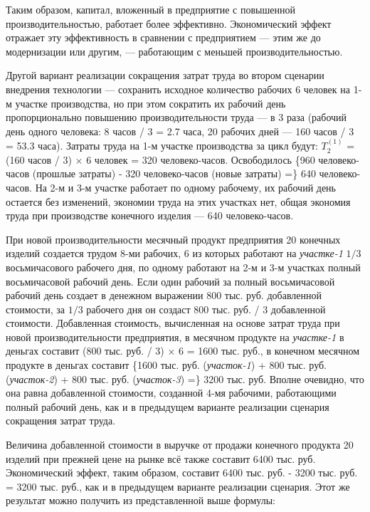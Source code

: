 \documentclass{article}
\let\textitorig\textit
\renewcommand{\textit}[1]{{\fontfamily{cmr}\selectfont \textitorig{#1}}}
\begin{document}
Таким образом, капитал, вложенный в предприятие с повышенной производительностью, работает более эффективно. Экономический эффект отражает эту эффективность в сравнении с предприятием — этим же до модернизации или другим, — работающим с меньшей производительностью.

Другой вариант реализации сокращения затрат труда во втором сценарии внедрения технологии — сохранить исходное количество рабочих 6 человек на 1-м участке производства, но при этом сократить их рабочий день пропорционально повышению производительности труда — в 3 раза (рабочий день одного человека: 8 часов / 3 = 2.7 часа, 20 рабочих дней — 160 часов / 3 = 53.3 часа). Затраты труда на 1-м участке производства за цикл будут: $T_2^{(1)}$ = (160 часов / 3) × 6 человек = 320 человеко-часов. Освободилось \{960 человеко-часов (прошлые затраты) - 320 человеко-часов (новые затраты) =\} 640 человеко-часов. На 2-м и 3-м участке работает по одному рабочему, их рабочий день остается без изменений, экономии труда на этих участках нет, общая экономия труда при производстве конечного изделия — 640 человеко-часов.

При новой производительности месячный продукт предприятия 20 конечных изделий создается трудом 8-ми рабочих, 6 из которых работают на \textit{участке-1} $1/3$ восьмичасового рабочего дня, по одному работают на 2-м и 3-м участках полный восьмичасовой рабочий день. Если один рабочий за полный восьмичасовой рабочий день создает в денежном выражении 800 тыс. руб. добавленной стоимости, за $1/3$ рабочего дня он создаст 800 тыс. руб. / 3 добавленной стоимости. Добавленная стоимость, вычисленная на основе затрат труда при новой производительности предприятия, в месячном продукте на \textit{участке-1} в деньгах составит (800 тыс. руб. / 3) × 6 = 1600 тыс. руб., в конечном месячном продукте в деньгах составит \{1600 тыс. руб. (\textit{участок-1}) + 800 тыс. руб. (\textit{участок-2}) + 800 тыс. руб. (\textit{участок-3}) =\} 3200 тыс. руб. Вполне очевидно, что она равна добавленной стоимости, созданной 4-мя рабочими, работающими полный рабочий день, как и в предыдущем варианте реализации сценария сокращения затрат труда.

Величина добавленной стоимости в выручке от продажи конечного продукта 20 изделий при прежней цене на рынке всё также составит 6400 тыс. руб. Экономический эффект, таким образом, составит 6400 тыс. руб. - 3200 тыс. руб. = 3200 тыс. руб., как и в предыдущем варианте реализации сценария. Этот же результат можно получить из представленной выше формулы:
\end{document}
